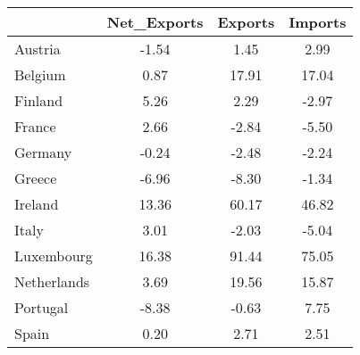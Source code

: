 \begin{table}[htbp]
\begin{tabular}{lccc} \hline \hline
 & Net_Exports  & Exports  & Imports  \\  \hline 
Austria &     -1.54 &      1.45 &      2.99 \\  
Belgium &      0.87 &     17.91 &     17.04 \\  
Finland &      5.26 &      2.29 &     -2.97 \\  
France &      2.66 &     -2.84 &     -5.50 \\  
Germany &     -0.24 &     -2.48 &     -2.24 \\  
Greece &     -6.96 &     -8.30 &     -1.34 \\  
Ireland &     13.36 &     60.17 &     46.82 \\  
Italy &      3.01 &     -2.03 &     -5.04 \\  
Luxembourg &     16.38 &     91.44 &     75.05 \\  
Netherlands &      3.69 &     19.56 &     15.87 \\  
Portugal &     -8.38 &     -0.63 &      7.75 \\  
Spain &      0.20 &      2.71 &      2.51 \\  
\hline \hline \end{tabular}
\end{table}
